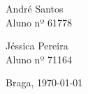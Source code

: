 \begin{titlepage}
\begin{center}
\begin{minipage}{0.4\textwidth}
\end{minipage}
\begin{minipage}{0.4\textwidth}
	\begin{flushright} 
		\large André Santos\\
           Aluno nº 61778
	\end{flushright}
\end{minipage}

\vfill
\begin{minipage}{0.4\textwidth}
	\begin{center}
		
\large Jéssica Pereira\\
       Aluno nº 71164
	\end{center}

\end{minipage}




\vfill

\large Braga, {\large \today}

\end{center}
\end{titlepage}
